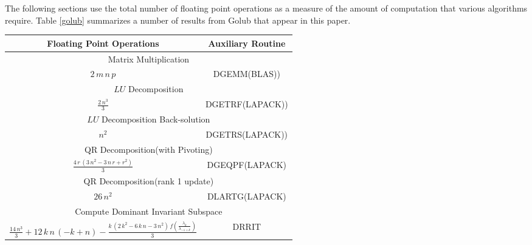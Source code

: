The following sections use the total number of floating point operations as
a measure of the amount of computation that various algorithms require.
Table \ref{golub} summarizes a number of results from Golub\cite{golub89}
that appear in this paper.


\begin{table*}[htbp]
  \begin{center}
    \leavevmode
    \begin{tabular}{|c|c|}
\hline
\multicolumn{1}{|c|}{Floating Point Operations}&
\multicolumn{1}{|c|}{Auxiliary Routine}\\
\hline
\hline
\multicolumn{2}{|c|}{Matrix Multiplication}\\
\hline
$2\,m\,n\,p$&DGEMM(BLAS))\\
\hline
\hline
\multicolumn{2}{|c|}{$LU$ Decomposition}\\
\hline
${\frac{2\,{n^3}}{3}}$&DGETRF(LAPACK))\\
\hline
\hline
\multicolumn{2}{|c|}{$LU$ Decomposition Back-solution}\\
\hline
${n^2}$&DGETRS(LAPACK))\\
\hline
\hline
\multicolumn{2}{|c|}{QR Decomposition(with Pivoting)}\\
\hline
${\frac{4\,r\,\left( 3\,{n^2} - 3\,n\,r + {r^2} \right) }{3}}$&DGEQPF(LAPACK)\\
\hline
\hline
\multicolumn{2}{|c|}{QR Decomposition(rank 1 update)}\\
\hline
$26\,{n^2}$&DLARTG(LAPACK)\\
\hline
\hline
\multicolumn{2}{|c|}{Compute Dominant Invariant Subspace}\\
\hline
${\frac{14\,{n^3}}{3}} + 12\,k\,n\,\left( -k + n \right)  - 
  {\frac{k\,\left( 2\,{k^2} - 6\,k\,n - 3\,{n^2} \right) \,
      f({\frac{{{\lambda}_k}}{{{\lambda}_{-1 + k}}}})}{3}}$&DRRIT\\
\hline
    \end{tabular}
    \caption{Floating Point Operation Counts}
    \label{golub}
  \end{center}
\end{table*}
